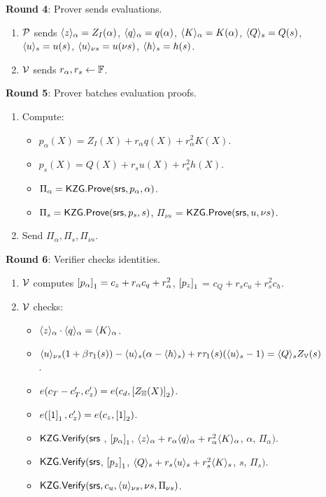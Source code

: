 \begin{figure}[htbp]
\begin{mdframed}
        {\bf Round 4}: Prover sends evaluations.
        \begin{enumerate}[leftmargin=1em, label=\arabic*.]
        \item $\prover$ sends $\val{\alpha}{z}=Z_I(\alpha)$, $\val{\alpha}{q}=q(\alpha)$, $\val{\alpha}{K}=K(\alpha)$,
        $\val{s}{Q}=Q(s)$, $\val{s}{u}=u(s)$, $\val{\nu s}{u}=u(\nu s)$, $\val{s}{h}=h(s)$.
        \item $\verifier$ sends $r_\alpha, r_s\gets \F$.
        \end{enumerate}

        {\bf Round 5}: Prover batches evaluation proofs.
        \begin{enumerate}[leftmargin=1em, label=\arabic*.]
        \item Compute:
            \begin{itemize}[leftmargin=1em, label=-]
            \item $p_\alpha(X)=Z_I(X) + r_\alpha q(X) + r_\alpha^2 K(X)$.
            \item $p_s(X) = Q(X) + r_s u(X) + r_s^2 h(X)$.
            \item $\Pi_\alpha = \kzgprove(\srs,p_\alpha,\alpha)$.
            \item $\Pi_s = \kzgprove(\srs,p_s,s)$, $\Pi_{\nu s}$ = $\kzgprove(\srs,u,\nu s)$.
            \end{itemize}
        \item Send $\Pi_\alpha, \Pi_s, \Pi_{\nu s}$.
        \end{enumerate}

        {\bf Round 6}: Verifier checks identities.
        \begin{enumerate}[leftmargin=1em, label=\arabic*.]
        \item $\verifier$ computes $\gone{p_\alpha}=c_z + r_\alpha c_q + r_\alpha^2$, $\gone{p_z}$ = $c_Q + r_s c_u + r_s^2 c_h$.
        \item $\verifier$ checks:
            \begin{itemize}[leftmargin=1em, label=-]
                \item $\val{\alpha}{z}\cdot \val{\alpha}{q}=\val{\alpha}{K}$.
                \item $\val{\nu s}{u}(1+\beta \tau_1(s)) - \val{s}{u}(\alpha - \val{s}{h}) + r\tau_1(s)(\val{s}{u}-1)=\val{s}{Q}Z_\setV(s)$.
                \item $e(c_T - c_T', c_z')=e(c_d, \gtwo{\vpolyN(X)})$.
                \item $e(\gone{1},c_z')=e(c_z, \gtwo{1})$.
                \item $\kzgverify(\srs$ ,
        $\gone{p_\alpha}$, $\val{\alpha}{z}+r_\alpha \val{\alpha}{q} + r_\alpha^2 \val{\alpha}{K}$, $\alpha$, $\Pi_\alpha)$.
                \item $\kzgverify(\srs$,
                $\gone{p_z}$,  $\val{s}{Q}+r_s \val{s}{u} + r_s^2 \val{s}{K}$, $s$, $\Pi_s)$.
                \item $\kzgverify(\srs,c_u, \val{\nu s}{u}, \nu s, \Pi_{\nu s})$.
            \end{itemize}
        \end{enumerate}


\end{mdframed}
\end{figure}
